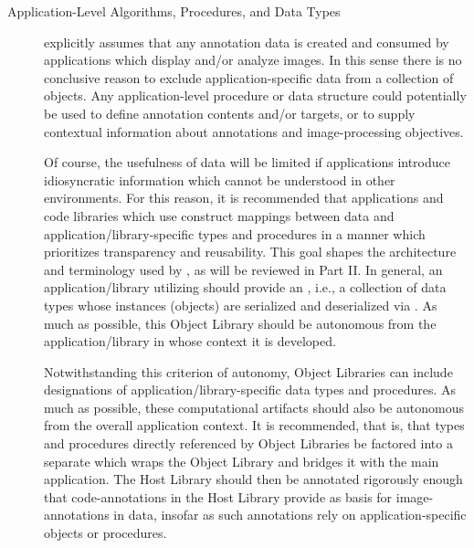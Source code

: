{\begin{description}
\item[Application-Level Algorithms, Procedures, 
and Data Types]  \lAXFI{} explicitly assumes 
that any annotation data is created and consumed 
by applications which display and/or analyze 
images.  In this sense there is no 
conclusive reason to exclude application-specific 
data from a collection of \AXFI{} objects.  
Any application-level procedure or data structure  
could potentially be used to define annotation 
contents and/or targets, or to supply contextual 
information about annotations and image-processing 
objectives.  

Of course, the usefulness of \AXFI{} data will 
be limited if applications introduce idiosyncratic 
information which cannot be understood in other 
\AXFI{} environments.  For this reason, it is 
recommended that applications and code libraries 
which use \AXFI{} construct mappings between 
\AXFI{} data and application/library-specific 
types and procedures in a manner which prioritizes 
transparency and reusability.  This goal shapes 
the architecture and terminology used by 
\AXFI{}, as will be reviewed in Part II.  
In general, an application/library utilizing 
\AXFI{} should provide an , 
i.e., a collection of data types whose instances 
(objects) are serialized and deserialized via 
\AXFI{}.  As much as possible, this Object Library 
should be autonomous from the application/library 
in whose context it is developed.

Notwithstanding this criterion of autonomy, 
\AXFI{} Object Libraries can include designations 
of application/library-specific data types 
and procedures.  As much as possible, these 
computational artifacts should also be 
autonomous from the overall application context.  
It is recommended, that is, that types and 
procedures directly referenced by \AXFI{} Object 
Libraries be factored into a separate 
 which wraps 
the Object Library and bridges it with the 
main application.  The Host Library should 
then be annotated rigorously enough that 
code-annotations in the Host Library 
provide as basis for image-annotations 
in \AXFI{} data, insofar as such annotations 
rely on application-specific objects or procedures. 


\end{description}}
